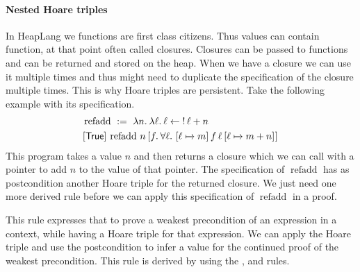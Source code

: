 \documentclass[thesis.tex]{subfiles}
\begin{document}
\paragraph*{Nested Hoare triples}
In HeapLang we functions are first class citizens. Thus values can contain function, at that point often called closures. Closures can be passed to functions and can be returned and stored on the heap. When we have a closure we can use it multiple times and thus might need to duplicate the specification of the closure multiple times. This is why Hoare triples are persistent. Take the following example with its specification.
\begin{align*}
     & \operatorname{refadd}\ :=\ \Lam n. \Lam \loc. \loc \gets \deref \loc + n                                                 \\
     & \hoare{\TRUE}{\operatorname{refadd}\, n}{\Ret f. {\forall \loc.\ \hoare{\loc \fmapsto m}{f\, \loc}{\loc\fmapsto m + n}}}
\end{align*}
This program takes a value $n$ and then returns a closure which we can call with a pointer to add $n$ to the value of that pointer. The specification of $\operatorname{refadd}$ has as postcondition another Hoare triple for the returned closure. We just need one more derived rule before we can apply this specification of $\operatorname{refadd}$ in a proof.
This rule expresses that to prove a weakest precondition of an expression in a context, while having a Hoare triple for that expression. We can apply the Hoare triple and use the postcondition to infer a value for the continued proof of the weakest precondition. This rule is derived by using the ,  and  rules.
\end{document}

